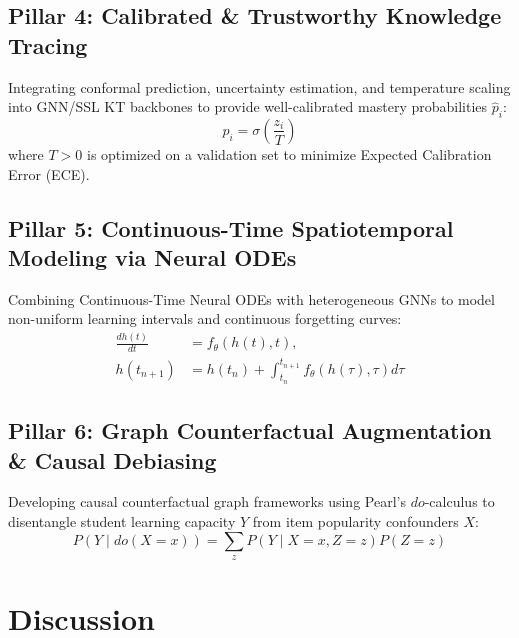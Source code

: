 ﻿\documentclass[10pt,journal,compsoc]{IEEEtran}
\begin{document}
\subsection{Pillar 4: Calibrated \& Trustworthy Knowledge Tracing}
Integrating conformal prediction, uncertainty estimation, and temperature scaling into GNN/SSL KT backbones to provide well-calibrated mastery probabilities $\hat{p}_i$:
\begin{equation}
\hat{p}_i = \sigma\left(\frac{z_i}{T}\right)
\end{equation}
where $T > 0$ is optimized on a validation set to minimize Expected Calibration Error (ECE).

\subsection{Pillar 5: Continuous-Time Spatiotemporal Modeling via Neural ODEs}
Combining Continuous-Time Neural ODEs with heterogeneous GNNs to model non-uniform learning intervals and continuous forgetting curves:
\begin{equation}
\begin{split}
\frac{dh(t)}{dt} &= f_\theta(h(t), t), \\
h(t_{n+1}) &= h(t_n) + \int_{t_n}^{t_{n+1}} f_\theta(h(\tau), \tau) d\tau
\end{split}
\end{equation}

\subsection{Pillar 6: Graph Counterfactual Augmentation \& Causal Debiasing}
Developing causal counterfactual graph frameworks using Pearl's $do$-calculus to disentangle student learning capacity $Y$ from item popularity confounders $X$:
\begin{equation}
P(Y \mid do(X = x)) = \sum_{z} P(Y \mid X = x, Z = z) P(Z = z)
\end{equation}

\section{Discussion}
\end{document}
